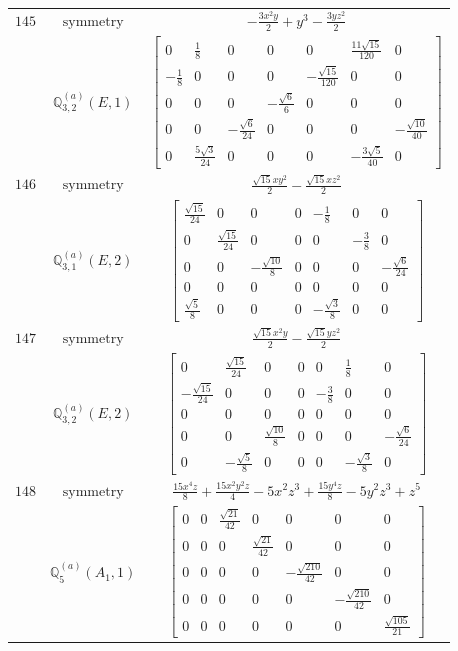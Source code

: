\documentclass[fleqn,8pt,landscape]{jsarticle}
\begin{document}
\begin{longtable}{ccc}
$ 145 $ & $ \text{symmetry} $ & $ - \frac{3 x^{2} y}{2} + y^{3} - \frac{3 y z^{2}}{2} $ \\
$  $ & $ \mathbb{Q}_{3,2}^{(a)}(E,1) $ & $ \begin{bmatrix} 0 & \frac{1}{8} & 0 & 0 & 0 & \frac{11 \sqrt{15}}{120} & 0 \\ - \frac{1}{8} & 0 & 0 & 0 & - \frac{\sqrt{15}}{120} & 0 & 0 \\ 0 & 0 & 0 & - \frac{\sqrt{6}}{6} & 0 & 0 & 0 \\ 0 & 0 & - \frac{\sqrt{6}}{24} & 0 & 0 & 0 & - \frac{\sqrt{10}}{40} \\ 0 & \frac{5 \sqrt{3}}{24} & 0 & 0 & 0 & - \frac{3 \sqrt{5}}{40} & 0 \end{bmatrix} $ \\ \hline
$ 146 $ & $ \text{symmetry} $ & $ \frac{\sqrt{15} x y^{2}}{2} - \frac{\sqrt{15} x z^{2}}{2} $ \\
$  $ & $ \mathbb{Q}_{3,1}^{(a)}(E,2) $ & $ \begin{bmatrix} \frac{\sqrt{15}}{24} & 0 & 0 & 0 & - \frac{1}{8} & 0 & 0 \\ 0 & \frac{\sqrt{15}}{24} & 0 & 0 & 0 & - \frac{3}{8} & 0 \\ 0 & 0 & - \frac{\sqrt{10}}{8} & 0 & 0 & 0 & - \frac{\sqrt{6}}{24} \\ 0 & 0 & 0 & 0 & 0 & 0 & 0 \\ \frac{\sqrt{5}}{8} & 0 & 0 & 0 & - \frac{\sqrt{3}}{8} & 0 & 0 \end{bmatrix} $ \\ \hline
$ 147 $ & $ \text{symmetry} $ & $ \frac{\sqrt{15} x^{2} y}{2} - \frac{\sqrt{15} y z^{2}}{2} $ \\
$  $ & $ \mathbb{Q}_{3,2}^{(a)}(E,2) $ & $ \begin{bmatrix} 0 & \frac{\sqrt{15}}{24} & 0 & 0 & 0 & \frac{1}{8} & 0 \\ - \frac{\sqrt{15}}{24} & 0 & 0 & 0 & - \frac{3}{8} & 0 & 0 \\ 0 & 0 & 0 & 0 & 0 & 0 & 0 \\ 0 & 0 & \frac{\sqrt{10}}{8} & 0 & 0 & 0 & - \frac{\sqrt{6}}{24} \\ 0 & - \frac{\sqrt{5}}{8} & 0 & 0 & 0 & - \frac{\sqrt{3}}{8} & 0 \end{bmatrix} $ \\ \hline
$ 148 $ & $ \text{symmetry} $ & $ \frac{15 x^{4} z}{8} + \frac{15 x^{2} y^{2} z}{4} - 5 x^{2} z^{3} + \frac{15 y^{4} z}{8} - 5 y^{2} z^{3} + z^{5} $ \\
$  $ & $ \mathbb{Q}_{5}^{(a)}(A_{1},1) $ & $ \begin{bmatrix} 0 & 0 & \frac{\sqrt{21}}{42} & 0 & 0 & 0 & 0 \\ 0 & 0 & 0 & \frac{\sqrt{21}}{42} & 0 & 0 & 0 \\ 0 & 0 & 0 & 0 & - \frac{\sqrt{210}}{42} & 0 & 0 \\ 0 & 0 & 0 & 0 & 0 & - \frac{\sqrt{210}}{42} & 0 \\ 0 & 0 & 0 & 0 & 0 & 0 & \frac{\sqrt{105}}{21} \end{bmatrix} $ \\ \hline

\end{longtable}
\end{document}

